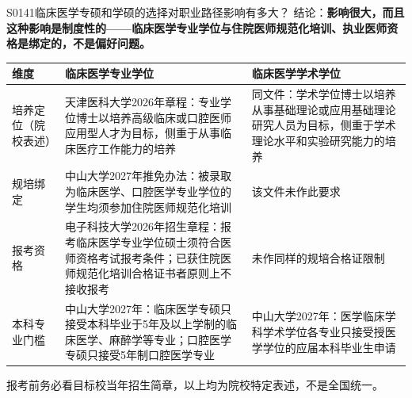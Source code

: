 \begin{qa}{S0141}{临床医学专硕和学硕的选择对职业路径影响有多大？}
结论：\textbf{影响很大，而且这种影响是制度性的——临床医学专业学位与住院医师规范化培训、执业医师资格是绑定的，不是偏好问题。}

\par\vspace{2pt}\nobreak\begin{center}\footnotesize
\begin{tabularx}{\textwidth}{>{\raggedright\arraybackslash}X>{\raggedright\arraybackslash}X>{\raggedright\arraybackslash}X}
\toprule
\textbf{维度} & \textbf{临床医学专业学位} & \textbf{临床医学学术学位} \\ \midrule
培养定位（院校表述） & 天津医科大学2026年章程：专业学位博士以培养高级临床或口腔医师应用型人才为目标，侧重于从事临床医疗工作能力的培养 & 同文件：学术学位博士以培养从事基础理论或应用基础理论研究人员为目标，侧重于学术理论水平和实验研究能力的培养 \\
规培绑定 & 中山大学2027年推免办法：被录取为临床医学、口腔医学专业学位的学生均须参加住院医师规范化培训 & 该文件未作此要求 \\
报考资格 & 电子科技大学2026年招生章程：报考临床医学专业学位硕士须符合医师资格考试报考条件；已获住院医师规范化培训合格证书者原则上不接收报考 & 未作同样的规培合格证限制 \\
本科专业门槛 & 中山大学2027年：临床医学专硕只接受本科毕业于5年及以上学制的临床医学、麻醉学等专业；口腔医学专硕只接受5年制口腔医学专业 & 中山大学2027年：医学临床学科学术学位各专业只接受授医学学位的应届本科毕业生申请 \\
\bottomrule
\end{tabularx}
\end{center}\vspace{2pt}\par

报考前务必看目标校当年招生简章，以上均为院校特定表述，不是全国统一。
\end{qa}

